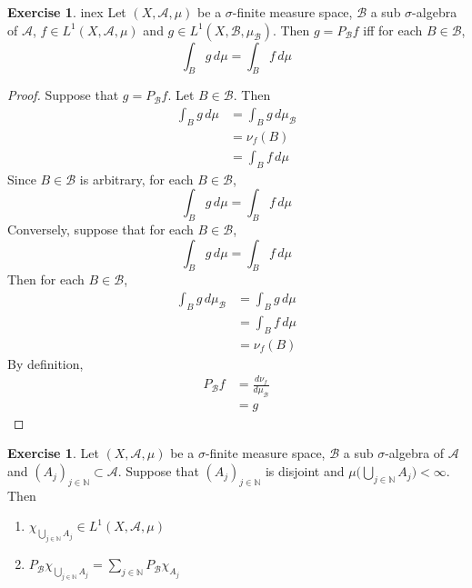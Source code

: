\documentclass[12pt]{amsart}
\theoremstyle{definition}
\newtheorem{ex}[definition]{Exercise}
\newcommand{\sig}{\sigma}
\newcommand{\N}{\mathbb{N}}
\newcommand{\MA}{\mathcal{A}}
\newcommand{\MB}{\mathcal{B}}
\newcommand{\dmu}{\, d \mu}
\begin{document}
	\begin{ex}
		in{ex}
		Let $(X, \MA, \mu)$ be a $\sig$-finite measure space, $\MB$ a sub $\sig$-algebra of $\MA$, $f \in L^1(X, \MA, \mu)$ and $g \in L^1(X, \MB, \mu_{\MB})$. Then $g = P_{\MB}f$ iff for each $B \in \MB$, 
		$$\int_B g \dmu = \int_B f \dmu$$
	\end{ex}

	\begin{proof}
		Suppose that $g = P_{\MB}f$. Let $B \in \MB$. Then 
		\begin{align*}
			\int_B g \dmu 
			& = \int_B g \dmu_{\MB} \\
			& = \nu_f(B) \\
			& = \int_B f \dmu 
		\end{align*}
		Since $B \in \MB$ is arbitrary, for each $B \in \MB$, 
		$$\int_B g \dmu = \int_B f \dmu$$ 
		Conversely, suppose that for each $B \in \MB$, 
		$$\int_B g \dmu = \int_B f \dmu$$ 
		Then for each $B \in \MB$,
		\begin{align*}
			\int_B g \dmu_{\MB} 
			& = \int_B g \dmu \\
			& = \int_B f \dmu \\
			& = \nu_f(B) 
		\end{align*} 
		By definition, 
		\begin{align*}
			P_{\MB}f 
			& =  \frac{d \nu_f}{d \mu_{\MB}} \\
			& = g
		\end{align*} 
	\end{proof}
	
	\begin{ex}
		Let $(X, \MA, \mu)$ be a $\sig$-finite measure space, $\MB$ a sub $\sig$-algebra of $\MA$ and $(A_{j})_{j \in \N} \subset \MA$. Suppose that $(A_j)_{j \in \N}$ is disjoint and $\mu \bigg(\bigcup\limits_{j \in \N} A_j \bigg) < \infty$. Then 
		\begin{enumerate}
			\item $\chi_{\bigcup\limits_{j \in \N} A_j} \in L^1(X, \MA, \mu)$
			\item $P_{\MB} \chi_{\bigcup\limits_{j \in \N} A_j} = \sum\limits_{j \in \N} P_{\MB}\chi_{A_j}$
		\end{enumerate}
	\end{ex}
	
\end{document}
